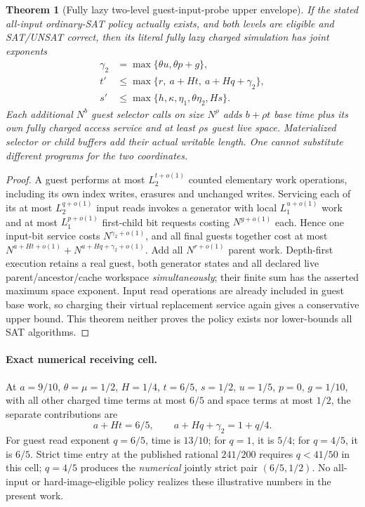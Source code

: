 \documentclass[11pt]{article}
\newtheorem{theorem}{Theorem}
\begin{document}
\begin{theorem}[Fully lazy two-level guest-input-probe upper envelope]
If the stated all-input ordinary-SAT policy actually exists, and
both levels are eligible and SAT/UNSAT correct, then its literal
fully lazy charged simulation has \emph{joint} exponents
\[
\boxed{\begin{aligned}
\gamma_2&=\max\{\theta u,\theta p+g\},\\
t'&\le\max\{r,\ a+Ht,\ a+Hq+\gamma_2\},\\
s'&\le\max\{h,\kappa,\eta_1,\theta\eta_2,Hs\}.
\end{aligned}}\tag{1}
\]
Each additional $N^b$ guest selector calls on size $N^\rho$ adds
$b+\rho t$ base time plus its own fully charged access service
and at least $\rho s$ guest live space. Materialized selector or
child buffers add their actual writable length. One cannot
substitute different programs for the two coordinates.
\end{theorem}
\begin{proof}
A guest performs at most $L_2^{t+o(1)}$ counted elementary
work operations, including its own index writes, erasures and
unchanged writes. Servicing each of its at most
$L_2^{q+o(1)}$ input reads invokes a generator with local
$L_1^{u+o(1)}$ work and at most $L_1^{p+o(1)}$ first-child
bit requests costing $N^{g+o(1)}$ each. Hence one
input-bit service costs $N^{\gamma_2+o(1)}$, and all final
guests together cost at most
$N^{a+Ht+o(1)}+N^{a+Hq+\gamma_2+o(1)}$.
Add all $N^{r+o(1)}$ parent work. Depth-first execution
retains a real guest, both generator states and all declared
live parent/ancestor/cache workspace \emph{simultaneously};
their finite sum has the asserted maximum space exponent.
Input read operations are already included in guest base work,
so charging their virtual replacement service again gives a
conservative upper bound. This theorem neither proves the
policy exists nor lower-bounds all SAT algorithms.
\end{proof}

\paragraph{Exact numerical receiving cell.} At
$a=9/10$, $\theta=\mu=1/2$, $H=1/4$, $t=6/5$,
$s=1/2$, $u=1/5$, $p=0$, $g=1/10$,
with all other charged time terms at most $6/5$ and space
terms at most $1/2$, the separate contributions are
\[
a+Ht=6/5,\qquad a+Hq+\gamma_2=1+q/4.
\]
For guest read exponent $q=6/5$, time is $13/10$;
for $q=1$, it is $5/4$; for $q=4/5$, it is $6/5$.
Strict time entry at the published rational $241/200$
requires $q<41/50$ in this cell; $q=4/5$ produces
the \emph{numerical} jointly strict pair $(6/5,1/2)$.
No all-input or hard-image-eligible policy realizes
these illustrative numbers in the present work.
\end{document}
